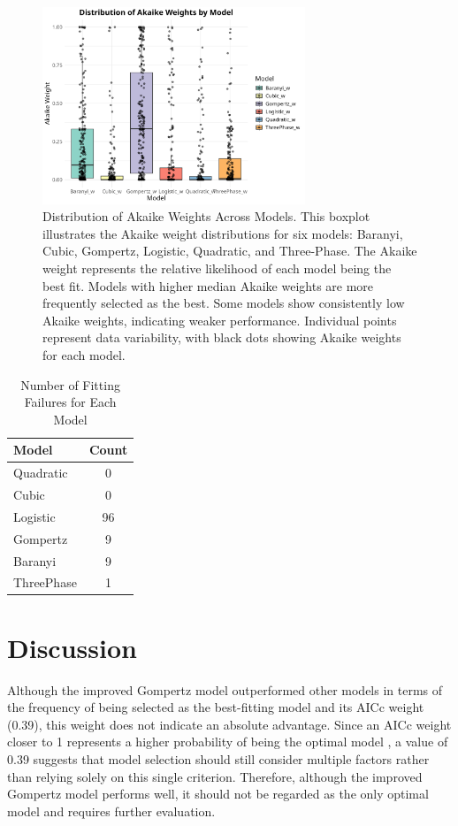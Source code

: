 \documentclass[12pt]{article}
\begin{document}
\begin{figure}[H]
    \centering
    \includegraphics[width=0.7\textwidth]{../results/akaike_weights_boxplot.png}
    \caption{Distribution of Akaike Weights Across Models. This boxplot illustrates the Akaike weight distributions for six models: Baranyi, Cubic, Gompertz, Logistic, Quadratic, and Three-Phase. The Akaike weight represents the relative likelihood of each model being the best fit. Models with higher median Akaike weights are more frequently selected as the best. Some models show consistently low Akaike weights, indicating weaker performance. Individual points represent data variability, with black dots showing Akaike weights for each model.}
    \label{fig:akaike_weights}
\end{figure}

\begin{table}[htbp]
\centering
\caption{Number of Fitting Failures for Each Model}
\label{tab:fitting_failures}
\begin{tabular}{l c}
\hline
Model & Count \\
\hline
Quadratic & 0 \\
Cubic     & 0 \\
Logistic  & 96 \\
Gompertz  & 9 \\
Baranyi   & 9 \\
ThreePhase& 1 \\
\hline
\end{tabular}
\end{table}

\section{Discussion}
Although the improved Gompertz model outperformed other models in terms of the frequency of being selected as the best-fitting model and its AICc weight (0.39), this weight does not indicate an absolute advantage. Since an AICc weight closer to 1 represents a higher probability of being the optimal model \citep{JohnsonOmland2004}, a value of 0.39 suggests that model selection should still consider multiple factors rather than relying solely on this single criterion. Therefore, although the improved Gompertz model performs well, it should not be regarded as the only optimal model and requires further evaluation.
\end{document}
